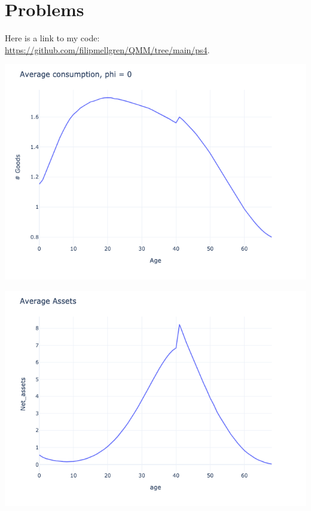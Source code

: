 \section{Problems}

Here is a link to my code: \url{https://github.com/filipmellgren/QMM/tree/main/ps4}.

\begin{questions}
\begin{solution}


\includegraphics[scale=0.5]{figures/consumption_0.png}

\includegraphics[scale=0.5]{figures/avg_assets_0.png}


\end{solution}
\end{questions}
